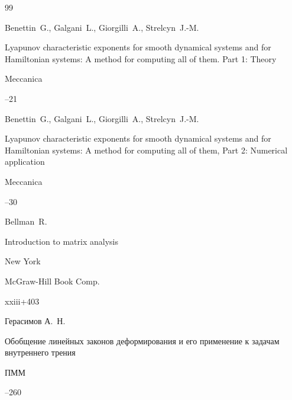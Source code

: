 \begin{thebibliography}{99}

\by Benettin~G., Galgani~L., Giorgilli~A., Strelcyn~J.-M.

\paper Lyapunov characteristic exponents for smooth dynamical systems and for Hamiltonian systems: A method for computing all of them. Part 1: Theory

\jour Meccanica




--21







\by Benettin~G., Galgani~L., Giorgilli~A., Strelcyn~J.-M.

\paper Lyapunov characteristic exponents for smooth dynamical systems and for Hamiltonian systems: A method for computing all of them, Part 2: Numerical application

\jour Meccanica




--30





\by Bellman~R.

\book Introduction to matrix analysis


\publaddr New York 

\publ McGraw-Hill Book Comp.

\totalpages xxiii+403





\by Герасимов А.~Н.

\paper Обобщение линейных законов деформирования и его применение к задачам внутреннего трения

\jour ПММ




--260



\end{thebibliography}
